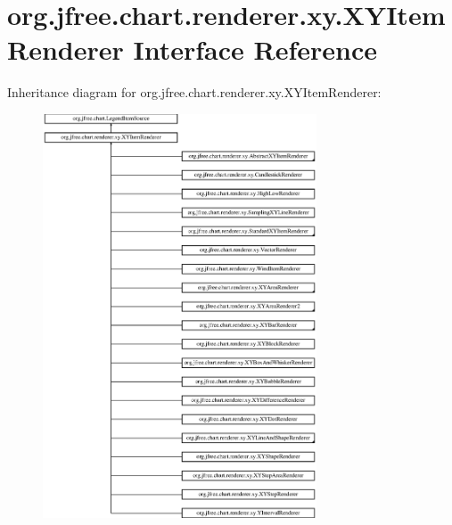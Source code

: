 \hypertarget{interfaceorg_1_1jfree_1_1chart_1_1renderer_1_1xy_1_1_x_y_item_renderer}{}\section{org.\+jfree.\+chart.\+renderer.\+xy.\+X\+Y\+Item\+Renderer Interface Reference}
\label{interfaceorg_1_1jfree_1_1chart_1_1renderer_1_1xy_1_1_x_y_item_renderer}
Inheritance diagram for org.\+jfree.\+chart.\+renderer.\+xy.\+X\+Y\+Item\+Renderer\+:\begin{figure}[H]
\begin{center}
\leavevmode
\includegraphics[height=12.000000cm]{interfaceorg_1_1jfree_1_1chart_1_1renderer_1_1xy_1_1_x_y_item_renderer}
\end{center}
\end{figure}
